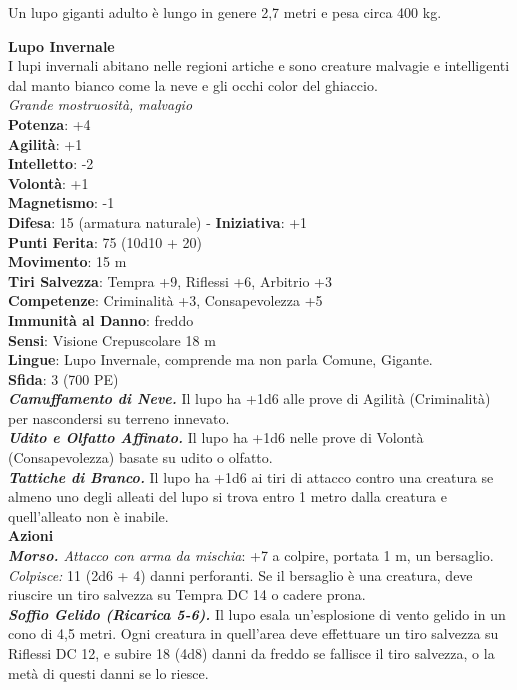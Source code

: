 \begin{multicols}{2}
Un lupo giganti adulto è lungo in genere 2,7 metri e pesa circa 400 kg. 

\medskip\textbf{Lupo Invernale}\\
I lupi invernali abitano nelle regioni artiche e sono creature malvagie e intelligenti dal manto bianco come la neve e gli occhi color del ghiaccio.\\
\emph{Grande mostruosità, malvagio}\\
\textbf{Potenza}: +4\\
\textbf{Agilità}: +1\\
\textbf{Intelletto}: -2\\
\textbf{Volontà}: +1\\
\textbf{Magnetismo}: -1\\
\textbf{Difesa}: 15 (armatura naturale) - \textbf{Iniziativa}: +1\\
\textbf{Punti Ferita}: 75 (10d10 + 20)\\
\textbf{Movimento}: 15 m\\
\textbf{Tiri Salvezza}: Tempra +9, Riflessi +6, Arbitrio +3 \\
\textbf{Competenze}: Criminalità +3, Consapevolezza +5\\
\textbf{Immunità al Danno}: freddo\\
\textbf{Sensi}: Visione Crepuscolare 18 m\\
\textbf{Lingue}:  Lupo Invernale, comprende ma non parla Comune, Gigante. \\
\textbf{Sfida}: 3 (700 PE)\smallskip\\
\emph{\textbf{Camuffamento di Neve.}} Il lupo ha +1d6 alle prove di Agilità (Criminalità) per nascondersi su terreno innevato.\\
\emph{\textbf{Udito e Olfatto Affinato.}} Il lupo ha +1d6 nelle prove di Volontà (Consapevolezza) basate su udito o olfatto.\\
\emph{\textbf{Tattiche di Branco.}} Il lupo ha +1d6 ai tiri di attacco contro una creatura se almeno uno degli alleati del lupo si trova entro 1 metro dalla creatura e quell'alleato non è inabile.\\
\smallskip\textbf{Azioni}\\
\emph{\textbf{Morso.} Attacco con arma da mischia}: +7 a colpire, portata 1 m, un bersaglio.\\
\emph{Colpisce:} 11 (2d6 + 4) danni perforanti. Se il bersaglio è una creatura, deve riuscire un tiro salvezza su Tempra DC 14 o cadere prona.\\
\emph{\textbf{Soffio Gelido (Ricarica 5-6).}} Il lupo esala un'esplosione di vento gelido in un cono di 4,5 metri. Ogni creatura in quell'area deve effettuare un tiro salvezza su Riflessi DC 12, e subire 18 (4d8) danni da freddo se fallisce il tiro salvezza, o la metà di questi danni se lo riesce. \\

\end{multicols}
